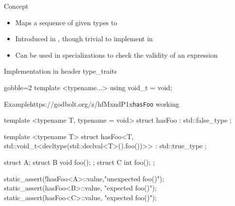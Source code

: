 \begin{frame}[fragile]
  \begin{block}{Concept}
    \begin{itemize}
    \item Maps a sequence of given types to 
    \item Introduced in , though trivial to implement in 
    \item Can be used in specializations to check the validity of an expression
    \end{itemize}
  \end{block}
  \begin{block}{Implementation in header type\_traits}
    \begin{cppcode*}{gobble=2}
      template <typename...>
      using void_t = void;
    \end{cppcode*}
  \end{block}
\end{frame}

\begin{frame}[fragile]
    \begin{exampleblockGB}{Example}{https://godbolt.org/z/hfMxndP1x}{\texttt{hasFoo} working}
      \begin{cppcode*}{}
      template <typename T, typename = void>
      struct hasFoo : std::false_type {};

      template <typename T>
      struct hasFoo<T,
         std::void_t<decltype(std::declval<T>().foo())>>
      : std::true_type {};

      struct A{}; struct B{ void foo(); };
      struct C{ int foo(); };

      static_assert(!hasFoo<A>::value,"unexpected foo()");
      static_assert(hasFoo<B>::value, "expected foo()");
      static_assert(hasFoo<C>::value, "expected foo()");
      \end{cppcode*}
    \end{exampleblockGB}
\end{frame}

